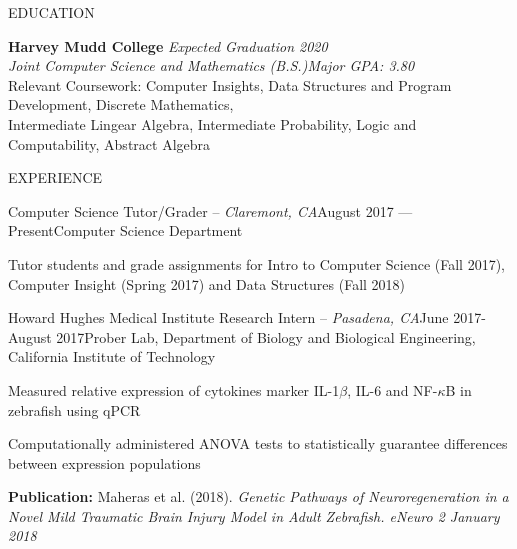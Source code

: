 \documentclass{resume} %
\begin{document}

\begin{rSection}{EDUCATION}

{\bf Harvey Mudd College} \hfill {\em Expected Graduation 2020} \\
{\em Joint Computer Science and Mathematics (B.S.)}\hfill {\em Major GPA: 3.80} \\
Relevant Coursework: Computer Insights, Data Structures and Program Development, Discrete Mathematics, \\Intermediate Lingear Algebra, Intermediate Probability, Logic and Computability, Abstract Algebra
\end{rSection}

\begin{rSection}{EXPERIENCE}
\begin{rSubsection}{Computer Science Tutor/Grader -- {\it Claremont, CA}}{August 2017 --- Present}{Computer Science Department}

\item Tutor students and grade assignments for Intro to Computer Science (Fall 2017), Computer Insight (Spring 2017) and Data Structures (Fall 2018)
\end{rSubsection}

\begin{rSubsection}{Howard Hughes Medical Institute Research Intern -- {\it Pasadena, CA}}{June 2017-August 2017}{Prober Lab, Department of Biology and Biological Engineering, California Institute of Technology}

\item Measured relative expression of cytokines marker IL-1$\beta$, IL-6 and NF-$\kappa$B in zebrafish using qPCR
\item Computationally administered ANOVA tests to statistically guarantee differences between expression populations
\item \textbf{Publication:} Maheras et al. (2018). \textit{Genetic Pathways of Neuroregeneration in a Novel Mild
Traumatic Brain Injury Model in Adult Zebrafish. eNeuro 2 January 2018}
\end{rSubsection}

\end{rSection}
\end{document}
